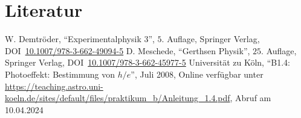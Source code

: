 \documentclass[12pt,a4paper]{scrartcl}
\numberwithin{equation}{section} %
\begin{document}
\clearpage
\hypertarget{literatur}{%
\section{Literatur}\label{literatur}}
\renewcommand{\section}[2]{}

\begin{thebibliography}{99}
	W. Demtröder, ``Experimentalphysik 3'', $5.$ Auflage, Springer Verlag,
	DOI~\href{https://doi.org/10.1007/978-3-662-49094-5}{10.1007/978-3-662-49094-5}
	D. Meschede, ``Gerthsen Physik'', $25.$ Auflage, Springer Verlag,
	DOI~\href{https://doi.org/10.1007/978-3-662-45977-5}{10.1007/978-3-662-45977-5}
		Universität zu Köln, ``B1.4: Photoeffekt: Bestimmung von $h/e$'', Juli 2008,
		Online verfügbar unter \url{https://teaching.astro.uni-koeln.de/sites/default/files/praktikum_b/Anleitung_1.4.pdf},
		Abruf am 10.04.2024
\end{thebibliography}
\end{document}
